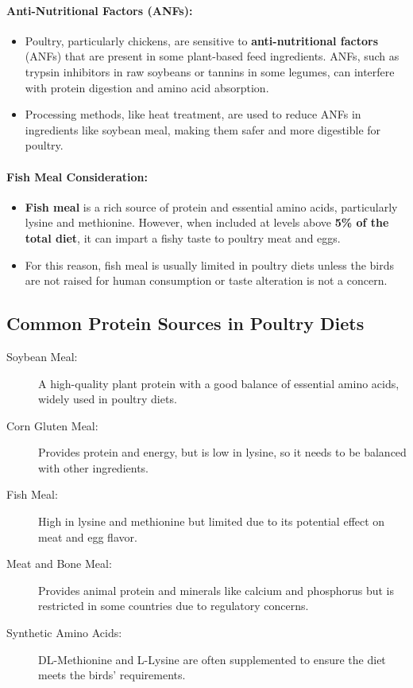 \documentclass[a4paper,12pt]{article}
\begin{document}
\paragraph{Anti-Nutritional Factors (ANFs):}
\begin{itemize}
	\item Poultry, particularly chickens, are sensitive to \textbf{anti-nutritional factors}
(ANFs) that are present in some plant-based feed ingredients. ANFs, such
as trypsin inhibitors in raw soybeans or tannins in some legumes, can
interfere with protein digestion and amino acid absorption.
	\item  Processing methods, like heat treatment, are used to reduce ANFs in
ingredients like soybean meal, making them safer and more digestible for
poultry.
\end{itemize}

\paragraph{Fish Meal Consideration:}
\begin{itemize}
	\item \textbf{Fish meal} is a rich source of protein and essential amino acids,
particularly lysine and methionine. However, when included at levels
above \textbf{5\% of the total diet}, it can impart a fishy taste to poultry meat and
eggs.
	\item For this reason, fish meal is usually limited in poultry diets unless the birds
are not raised for human consumption or taste alteration is not a concern.
\end{itemize}

\subsection{Common Protein Sources in Poultry Diets}
\begin{description}
	\item[Soybean Meal:] A high-quality plant protein with a good balance of essential
amino acids, widely used in poultry diets.
	\item[Corn Gluten Meal:] Provides protein and energy, but is low in lysine, so it needs
to be balanced with other ingredients.
	\item[Fish Meal:] High in lysine and methionine but limited due to its potential effect on
meat and egg flavor.
	\item[Meat and Bone Meal:] Provides animal protein and minerals like calcium and
phosphorus but is restricted in some countries due to regulatory concerns.
	\item[Synthetic Amino Acids:] DL-Methionine and L-Lysine are often supplemented to
ensure the diet meets the birds’ requirements.
\end{description}
\end{document}
